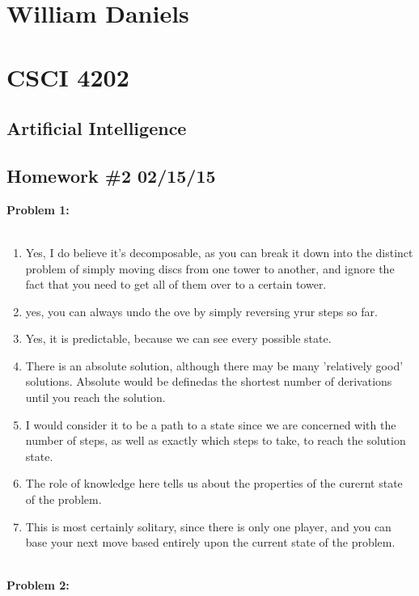 \documentclass[11pt]{article}
\begin{document}
\begin{center}
\section*{William Daniels}
\section*{CSCI 4202}
\subsection*{Artificial Intelligence}
\subsection*{Homework \#2 02/15/15}
\end{center}

\vspace{.25cm}

\textbf{Problem 1:}\\\\
\begin{enumerate}
\item Yes, I do believe it's decomposable, as you can break it down into the distinct problem of simply moving discs from one tower to another, and ignore the fact that you need to get all of them over to a certain tower. 
\item yes, you can always undo the ove by simply reversing yrur steps so far. 
\item Yes, it is predictable, because we can see every possible state. 
\item There is an absolute solution, although there may be many 'relatively good' solutions. Absolute would be definedas the shortest number of derivations until you reach the solution. 
\item I would consider it to be a path to a state since we are concerned with the number of steps, as well as exactly which steps to take, to reach the solution state. 
\item The role of knowledge here tells us about the properties of the curernt state of the problem. 
\item This is most certainly solitary, since there is only one player, and you can base your next move based entirely upon the current state of the problem. \\\\
\end{enumerate}
\hspace{.5cm} \textbf{Problem 2:} \\
\end{document}
